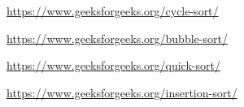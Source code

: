 \documentclass[journal]{IEEEtran}
\begin{document}
\ifCLASSOPTIONcaptionsoff
  \newpage
\fi
    

\begin{thebibliography}{1}
    \url{https://www.geeksforgeeks.org/cycle-sort/} \par
{}
    \url{https://www.geeksforgeeks.org/bubble-sort/} \par
{}
    \url{https://www.geeksforgeeks.org/quick-sort/} \par
{}
    \url{https://www.geeksforgeeks.org/insertion-sort/} \par

\end{thebibliography}
\end{document}
